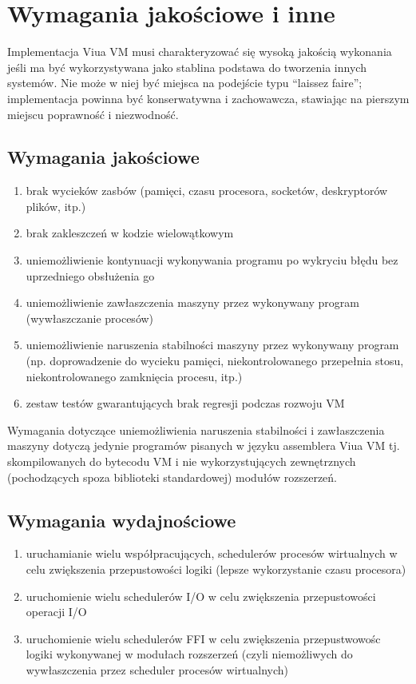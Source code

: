 \documentclass[11pt,oneside,a4paper,titlepage,onecolumn]{article}
\begin{document}
\section{Wymagania jakościowe i inne}

Implementacja Viua VM musi charakteryzować się wysoką jakością wykonania jeśli ma być wykorzystywana jako
stablina podstawa do tworzenia innych systemów. Nie może w niej być miejsca na podejście typu ``laissez
faire''; implementacja powinna być konserwatywna i zachowawcza, stawiając na pierszym miejscu poprawność i
niezwodność.

\subsection{Wymagania jakościowe}

\begin{enumerate}
    \item brak wycieków zasbów (pamięci, czasu procesora, socketów, deskryptorów plików, itp.)
    \item brak zakleszczeń w kodzie wielowątkowym
    \item uniemożliwienie kontynuacji wykonywania programu po wykryciu błędu bez uprzedniego obsłużenia go
    \item uniemożliwienie zawłaszczenia maszyny przez wykonywany program (wywłaszczanie procesów)
    \item uniemożliwienie naruszenia stabilności maszyny przez wykonywany program (np. doprowadzenie do
        wycieku pamięci, niekontrolowanego przepełnia stosu, niekontrolowanego zamknięcia procesu, itp.)
    \item zestaw testów gwarantujących brak regresji podczas rozwoju VM
\end{enumerate}

Wymagania dotyczące uniemożliwienia naruszenia stabilności i zawłaszczenia maszyny dotyczą jedynie programów
pisanych w języku assemblera Viua VM tj. skompilowanych do bytecodu VM i nie wykorzystujących zewnętrznych
(pochodzących spoza biblioteki standardowej) modułów rozszerzeń.

\subsection{Wymagania wydajnościowe}

\begin{enumerate}
    \item uruchamianie wielu współpracujących, schedulerów procesów wirtualnych w celu zwiększenia
        przepustowości logiki (lepsze wykorzystanie czasu procesora)
    \item uruchomienie wielu schedulerów I/O w celu zwiększenia przepustowości operacji I/O
    \item uruchomienie wielu schedulerów FFI w celu zwiększenia przepustwowośc logiki wykonywanej w modułach
        rozszerzeń (czyli niemożliwych do wywłaszczenia przez scheduler procesów wirtualnych)
\end{enumerate}
\end{document}
